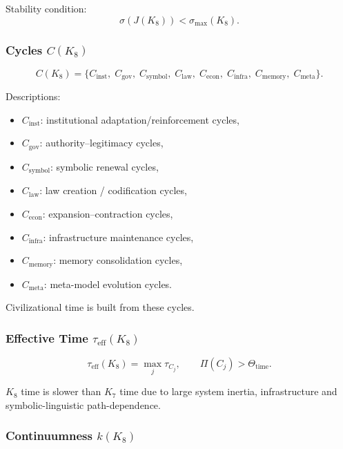 Stability condition:
\[
\sigma(J(K_8)) < \sigma_{\max}(K_8).
\]

\subsubsection{Cycles \texorpdfstring{$C(K_8)$}{C(K_8)}}

\[
C(K_8)=
\{
C_{\mathrm{inst}},\;
C_{\mathrm{gov}},\;
C_{\mathrm{symbol}},\;
C_{\mathrm{law}},\;
C_{\mathrm{econ}},\;
C_{\mathrm{infra}},\;
C_{\mathrm{memory}},\;
C_{\mathrm{meta}}
\}.
\]

Descriptions:
\begin{itemize}
    \item $C_{\mathrm{inst}}$: institutional adaptation/reinforcement cycles,
    \item $C_{\mathrm{gov}}$: authority–legitimacy cycles,
    \item $C_{\mathrm{symbol}}$: symbolic renewal cycles,
    \item $C_{\mathrm{law}}$: law creation / codification cycles,
    \item $C_{\mathrm{econ}}$: expansion–contraction cycles,
    \item $C_{\mathrm{infra}}$: infrastructure maintenance cycles,
    \item $C_{\mathrm{memory}}$: memory consolidation cycles,
    \item $C_{\mathrm{meta}}$: meta-model evolution cycles.
\end{itemize}

Civilizational time is built from these cycles.

\subsubsection{Effective Time \texorpdfstring{$\tau_{\mathrm{eff}}(K_8)$}{tau_eff(K8)}}

\[
\tau_{\mathrm{eff}}(K_8)=\max_j \tau_{C_j},
\qquad
\Pi(C_j) > \Theta_{\mathrm{time}}.
\]

$K_8$ time is slower than $K_7$ time due to large system inertia,
infrastructure and symbolic-linguistic path-dependence.

\subsubsection{Continuumness \texorpdfstring{$k(K_8)$}{k(K_8)}}

